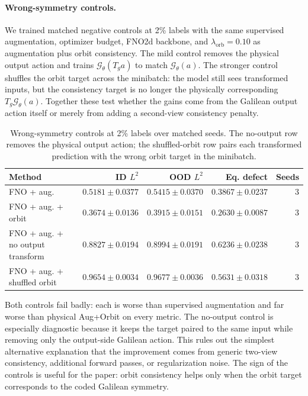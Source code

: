 \paragraph{Wrong-symmetry controls.} We trained matched negative controls at 2\% labels with the same supervised augmentation, optimizer budget, FNO2d backbone, and \(\lambda_{\mathrm{orb}}=0.10\) as augmentation plus orbit consistency. The mild control removes the physical output action and trains \(\mathcal G_\theta(T_g a)\) to match \(\mathcal G_\theta(a)\). The stronger control shuffles the orbit target across the minibatch: the model still sees transformed inputs, but the consistency target is no longer the physically corresponding \(T_g\mathcal G_\theta(a)\). Together these test whether the gains come from the Galilean output action itself or merely from adding a second-view consistency penalty.

\begin{table}[t]
\centering
\small
\caption{Wrong-symmetry controls at 2\% labels over matched seeds. The no-output row removes the physical output action; the shuffled-orbit row pairs each transformed prediction with the wrong orbit target in the minibatch.}
\label{tab:new-wrong-symmetry-control}
\begin{tabular}{lrrrr}
\toprule
Method & ID \(L^2\) & OOD \(L^2\) & Eq. defect & Seeds \\
\midrule
FNO + aug. & \(0.5181\pm0.0377\) & \(0.5415\pm0.0370\) & \(0.3867\pm0.0237\) & 3 \\
FNO + aug. + orbit & \(0.3674\pm0.0136\) & \(0.3915\pm0.0151\) & \(0.2630\pm0.0087\) & 3 \\
FNO + aug. + no output transform & \(0.8827\pm0.0194\) & \(0.8994\pm0.0191\) & \(0.6236\pm0.0238\) & 3 \\
FNO + aug. + shuffled orbit & \(0.9654\pm0.0034\) & \(0.9677\pm0.0036\) & \(0.5631\pm0.0318\) & 3 \\
\bottomrule
\end{tabular}
\end{table}

Both controls fail badly: each is worse than supervised augmentation and far worse than physical Aug+Orbit on every metric. The no-output control is especially diagnostic because it keeps the target paired to the same input while removing only the output-side Galilean action. This rules out the simplest alternative explanation that the improvement comes from generic two-view consistency, additional forward passes, or regularization noise. The sign of the controls is useful for the paper: orbit consistency helps only when the orbit target corresponds to the coded Galilean symmetry.

